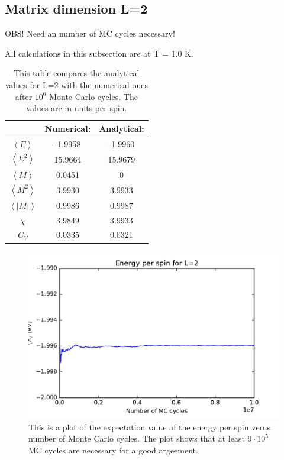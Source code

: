 \subsection{Matrix dimension L=2}

OBS! Need an number of MC cycles necessary!

All calculations in this subsection are at T = 1.0 K. 

\begin{table}\caption{This table compares the analytical values for L=2 with the numerical ones after $10^6$ Monte Carlo cycles. The values are in units per spin.}\label{tab:compare_values}
\begin{tabular}{ccc}
& Numerical: & Analytical:\\ \hline
$\left<E\right>$ &   -1.9958 & -1.9960\\
$\left<E^2\right>$ &   15.9664 & 15.9679\\
$\left<M\right>$ &    0.0451 & 0\\
$\left<M^2\right>$ &    3.9930 & 3.9933\\
$\left<|M|\right>$ &    0.9986 & 0.9987\\
$\chi$ &   3.9849 & 3.9933\\
  $C_V$& 0.0335 & 0.0321\\
\end{tabular}
\end{table}

\begin{figure}[H]
\includegraphics[width=\linewidth]{../results/4b/L_2_energy}\caption{This is a plot of the expectation value of the energy per spin verus number of Monte Carlo cycles. The plot shows that at least $ 9 \cdot 10^{5} $ MC cycles are necessary for a good argeement.}\label{fig:L_2_energy}
\end{figure}


